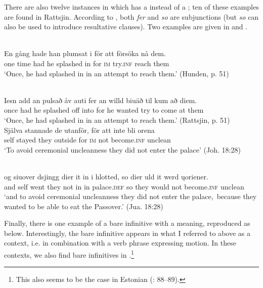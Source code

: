 \documentclass[output=paper]{langscibook}
\begin{document}
There are also twelve instances in which  has a  instead of a ; ten of these examples are found in Rattsjin. According to \citet[491]{AkerbergNystrom2012}, both \textit{fer} and \textit{so} are  subjunctions (but \textit{so} can also be used to introduce resultative clauses). Two examples are given in  and .  

\ea
\label{ex:kalm:20}
\ea {}\label{ex:kalm:20a}\\
\gll En gång hade han plumsat i för att försöka nå dem.\\
one time had he splashed in for \textsc{im} try.\textsc{inf} reach them\\ 
\glt ‘Once, he had splashed in in an attempt to reach them.’ (Hunden, p. 51)

\ex {}\label{ex:kalm:20b}\\
\gll Iesn add an pulsað åv auti fer an willd biuäð til kum að diem.\\
once had he splashed off into for he wanted try to come at them\\
\glt ‘Once, he had splashed in in an attempt to reach them.’ (Rattsjin, p. 51)
\z 
\ex
\label{ex:kalm:21}
\ea {}\label{ex:kalm:21a}\\ 
\gll Själva stannade de utanför, för att inte bli orena\\
self stayed they outside for \textsc{im} not become.\textsc{inf} unclean\\
\glt ‘To avoid ceremonial uncleanness they did not enter the palace’ (Joh. 18:28)

\ex {}\label{ex:kalm:21b}\\
\gll og siuover dsjingg dier it in i hlotted, so dier uld it werd \k{u}oriener.\\
and self went they not in in palace.\textsc{def} so they would not become.\textsc{inf} unclean\\
\glt ‘and to avoid ceremonial uncleanness they did not enter the palace,{~}because they wanted to be able to eat the Passover.’ (Jua. 18:28)
\z 
\z\largerpage[2]


Finally, there is one example of a bare infinitive with a  meaning, reproduced as  below. Interestingly, the bare infinitive appears in what I referred to above as a  context, i.e. in combination with a verb phrase expressing motion. In these contexts, we also find bare infinitives in .\footnote{This also seems to be the case in Estonian  (\citealt{Lagman1958}: 88–89).} 
\end{document}

